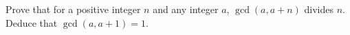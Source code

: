 Prove that for a positive integer $n$ and any integer $a$, $\gcd(a,a+n)$ divides $n$. Deduce that $\gcd(a,a+1)=1$.
